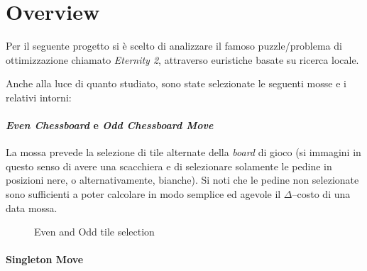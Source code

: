\section{Overview} %
\label{sec:overview}
    
    Per il seguente progetto si è scelto di analizzare il famoso puzzle/problema di ottimizzazione chiamato \emph{Eternity 2}, attraverso euristiche basate su ricerca locale.

    Anche alla luce di quanto studiato, sono state selezionate le seguenti mosse e i relativi intorni:

    \paragraph{\emph{Even Chessboard} e \emph{Odd Chessboard Move}} %
    \label{par:even_odd}
        La mossa prevede la selezione di tile alternate della \emph{board} di gioco (si immagini in questo senso di avere una scacchiera e di selezionare solamente le pedine in posizioni nere, o alternativamente, bianche). Si noti che le pedine non selezionate sono sufficienti a poter calcolare in modo semplice ed agevole il $\Delta$--costo di una data mossa.

        \begin{figure}[H]
            \centering
            \caption{Even and Odd tile selection}
        \end{figure}


    \paragraph{Singleton Move} %
    \label{par:singleton}
    

